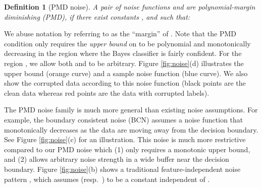 \documentclass{article} \usepackage{iclr2021_conference,times}
\newtheorem{definition}{Definition}
\begin{document}
\begin{definition}[PMD noise] \label{poly_diminish}
A pair of noise functions  and  are polynomial-margin diminishing (PMD), if there exist constants , and  such that:

\end{definition}

We abuse notation by referring to  as the ``margin'' of . Note that the PMD condition only requires the \emph{upper bound} on  to be polynomial and monotonically decreasing in the region where the Bayes classifier is fairly confident. For the region , we allow both  and  to be arbitrary. Figure \ref{fig:noise}(d) illustrates the upper bound (orange curve) and a sample noise function (blue curve). We also show the corrupted data according to this noise function (black points are the clean data whereas red points are the data with corrupted labels). 

The PMD noise family is much more general than existing noise assumptions. 
For example, the boundary consistent noise (BCN) \citep{du_BCN_2015_AAAI,Aditya_Binary_Instance_2018_MachLearn} assumes a noise function that monotonically decreases as the data are moving away from the decision boundary. See Figure \ref{fig:noise}(c) for an illustration.
This noise is much more restrictive compared to our PMD noise which (1) only requires a monotonic upper bound, and (2) allows arbitrary noise strength in a wide buffer near the decision boundary. 
Figure \ref{fig:noise}(b) shows a traditional feature-independent noise pattern \citep{reed_bootstrapping_ICLRW2014,patrini_CVPR2017_FCorrection}, which assumes  (resp.~) to be a constant independent of . 
\end{document}

